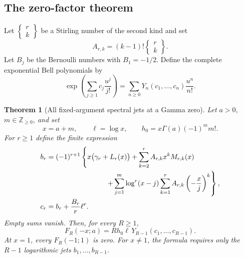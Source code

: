 \documentclass[11pt,letterpaper]{article}
\numberwithin{equation}{section}
\theoremstyle{plain}
\newtheorem{theorem}{Theorem}[section]
\theoremstyle{definition}
\theoremstyle{remark}
\begin{document}
\subsection{The zero-factor theorem}

Let $\left\{\begin{smallmatrix}r\\k\end{smallmatrix}\right\}$ be a
Stirling number of the second kind and set
\begin{equation}
 A_{r,k}=(k-1)!
        \left\{\begin{matrix}r\\k\end{matrix}\right\}.
 \label{mz:A}
\end{equation}
Let $B_j$ be the Bernoulli numbers with $B_1=-1/2$. Define the complete
exponential Bell polynomials by
\[
 \exp\left(\sum_{j\ge1}c_j\frac{u^j}{j!}\right)
       =\sum_{n\ge0}Y_n(c_1,\ldots,c_n)\frac{u^n}{n!}.
\]

\begin{theorem}[All fixed-argument spectral jets at a Gamma zero]
\label{mz:thm:zero}
Let $a>0$, $m\in\mathbb Z_{\ge0}$, and set
\[
 x=a+m,\qquad \ell=\log x,\qquad
 h_0=x\Gamma(a)(-1)^m m!.
\]
For $r\ge1$ define the finite expression
\begin{align}
 b_r={}&(-1)^{r+1}\left\{
      x\bigl(\gamma_r+L_r(x)\bigr)
       +\sum_{k=2}^{r}A_{r,k}x^kM_{r,k}(x)\right.\notag\\
 &\hspace{25mm}\left.
       +\sum_{j=1}^{m}\log^r(x-j)
            \sum_{k=1}^{r}A_{r,k}\left(-\frac xj\right)^k
                        \right\},\label{mz:b}\\
 c_r={}&b_r+\frac{B_r}{r}\ell^r.
 \label{mz:c}
\end{align}
Empty sums vanish. Then, for every $R\ge1$,
\begin{equation}
 \boxed{F_R(-x;a)
    =R h_0\ell\,Y_{R-1}(c_1,\ldots,c_{R-1}).}
 \label{mz:allzero}
\end{equation}
At $x=1$, every $F_R(-1;1)$ is zero. For $x\ne1$, the formula requires
only the $R-1$ logarithmic jets $b_1,\ldots,b_{R-1}$.
\end{theorem}
\end{document}
